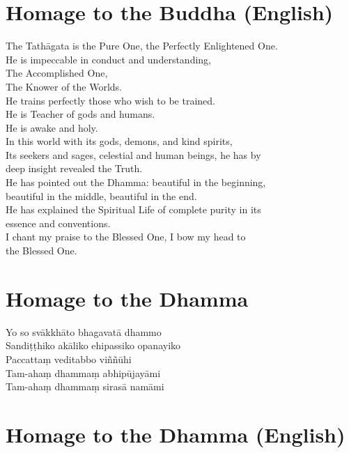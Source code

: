 \section*{Homage to the Buddha (English)}

\begin{leader}
\end{leader}

The Tathāgata is the Pure One, the Perfectly Enlightened One.\\
He is impeccable in conduct and understanding,\\
The Accomplished One,\\
The Knower of the Worlds.\\
He trains perfectly those who wish to be trained.\\
He is Teacher of gods and humans.\\
He is awake and holy.\\
In this world with its gods, demons, and kind spirits,\\
Its seekers and sages, celestial and human beings, he has by \\deep insight revealed the Truth.\\
He has pointed out the Dhamma: beautiful in the beginning, \\beautiful in the middle, beautiful in the end.\\
He has explained the Spiritual Life of complete purity in its \\essence and conventions.\\
I chant my praise to the Blessed One, I bow my head to \\the Blessed One.

\section*{Homage to the Dhamma}

\begin{leader}
\end{leader}

Yo so svākkhāto bhagavatā dhammo\\
Sandiṭṭhiko akāliko ehipassiko opanayiko\\
Paccattaṃ veditabbo viññūhi\\
Tam-ahaṃ dhammaṃ abhipūjayāmi\\
Tam-ahaṃ dhammaṃ sirasā namāmi

\section*{Homage to the Dhamma (English)}


